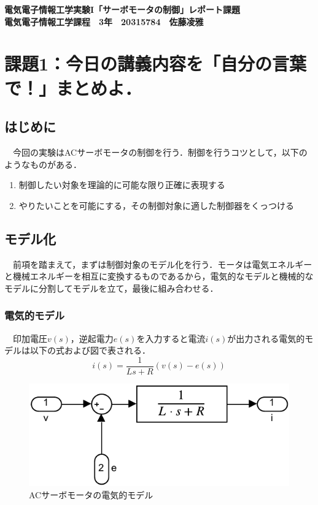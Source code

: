 


\fontsize{14.041pt}{18.562pt}\selectfont
\begin{center}
    \textbf{
    電気電子情報工学実験I「サーボモータの制御」レポート課題\\
    電気電子情報工学課程　3年　20315784　佐藤凌雅\\
    }
\end{center}

\fontsize{11.041pt}{16.562pt}\selectfont

\section{課題1：今日の講義内容を「自分の言葉で！」まとめよ．}
\subsection{はじめに}
　今回の実験はACサーボモータの制御を行う．制御を行うコツとして，以下のようなものがある．
\begin{enumerate}
    \item 制御したい対象を理論的に可能な限り正確に表現する
    \item やりたいことを可能にする，その制御対象に適した制御器をくっつける
\end{enumerate}

\subsection{モデル化}
　前項を踏まえて，まずは制御対象のモデル化を行う．モータは電気エネルギーと機械エネルギーを相互に変換するものであるから，電気的なモデルと機械的なモデルに分割してモデルを立て，最後に組み合わせる．\\

\subsubsection{電気的モデル}
　印加電圧$v(s)$，逆起電力$e(s)$を入力すると電流$i(s)$が出力される電気的モデルは以下の式および図で表される．
\begin{equation}
    i(s) = \frac{1}{Ls + R}\left(v(s) - e(s)\right)
\end{equation}

\begin{figure}[H]
    \centering
    \includegraphics[]{./fig/fig1.pdf}
    \caption{ACサーボモータの電気的モデル}
\end{figure}

